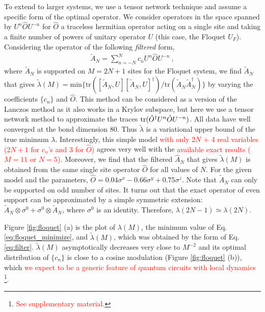 \documentclass[twocolumn,superscriptaddress, prl,showpacs]{revtex4-1}
\newcommand{\addr}[1]{\textcolor{red}{#1}}
\begin{document}
To extend to larger systems, we use a tensor network technique and assume a specific form of the optimal operator.
We consider operators in the space spanned by $U^n \hat{O} U^{- n}$ for $\hat{O}$ a traceless hermitian operator acting on a single site
and taking a finite number of powers of unitary operator $U$ (this case, the Floquet $U_F$).
Considering the operator of the following {\it filtered} form,
\begin{align}
 \tilde{A}_N=\sum_{n=-N}^N c_n U^n \hat{O} U^{- n} ~,
 \label{eq:filter}
\end{align}
where $\tilde{A}_N$ is supported on $M = 2N+1$ sites for the Floquet system,
we find $\tilde{A}_N$ that gives $\tilde{\lambda}(M) = \mathrm{min}\{\mathrm{tr}([\tilde{A}_N,U][\tilde{A}_N,U]^\dag)/\mathrm{tr}(\tilde{A}_N\tilde{A}_N^\dag)\}$
by varying the coefficients $\{c_n\}$ and $\hat{O}$.
This method can be considered as a version of the Lanczos method as it also works in a Krylov subspace,
but here we use a tensor network method to approximate the traces ${\rm tr}(\hat{O}^\dagger U^n \hat{O} U^{-n})$. %
All data %
have well converged at the bond dimension 80.
Thus $\tilde{\lambda}$ is a variational upper bound of the true minimum $\lambda$.
Interestingly, this simple model \addr{with only 2$N$ + 4 real variables ($2N+1$ for $c_n$'s and 3 for $\hat{O}$)}
agrees very well with the \addr{available exact results ($M =11$ or $N = 5$).}
Moreover, we find that the filtered $\hat{A}_N$ that gives $\tilde{\lambda}(M)$
is obtained from the same single site operator $\hat{O}$ for all values of $N$.
For the given model and the parameters, $\hat{O} = 0.04\sigma^x  - 0.66\sigma^y + 0.75\sigma^z$.
Note that $\tilde{A}_N$ can only be supported on odd number of sites.
It turns out that the exact operator of even support can be approximated by a simple symmetric extension:
$\tilde{A}_N\otimes \sigma^0 + \sigma^0\otimes\tilde{A}_N$, where $\sigma^0$ is an identity.
Therefore, $\lambda(2N-1) \simeq \lambda(2N)$.


Figure \ref{fig:floquet} (a) is the plot of $\lambda (M)$, the minimum value of Eq. \ref{eq:floquet_minimize}, and
$\tilde{\lambda}(M)$, which was obtained by the form of Eq. \eqref{eq:filter}.
$\tilde{\lambda}(M)$ asymptotically decreases very close to $M^{-2}$
and its optimal distribution of $\{ c_n\}$ is close to a cosine modulation (Figure \ref{fig:floquet} (b)),
which \addr{we expect to be a generic feature of quantum circuits with local dynamics 
\footnote{\addr{See supplementary material.}}.} %
\end{document}
